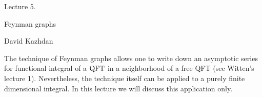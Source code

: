 \def\dbC{{\Bbb C}} 

\def\gr#1{{\fam\eufmfam\relax#1}}

\def\grA{{\gr A}}	\def\gra{{\gr a}}
\def\grB{{\gr B}}	\def\grb{{\gr b}}
\def\grC{{\gr C}}	\def\grc{{\gr c}}
\def\grD{{\gr D}}	\def\grd{{\gr d}}
\def\grE{{\gr E}}	\def\gre{{\gr e}}
\def\grF{{\gr F}}	\def\grf{{\gr f}}
\def\grG{{\gr G}}	\def\grg{{\gr g}}
\def\grH{{\gr H}}	\def\grh{{\gr h}}
\def\grI{{\gr I}}	\def\gri{{\gr i}}
\def\grJ{{\gr J}}	\def\grj{{\gr j}}
\def\grK{{\gr K}}	\def\grk{{\gr k}}
\def\grL{{\gr L}}	\def\grl{{\gr l}}
\def\grM{{\gr M}}	\def\grm{{\gr m}}
\def\grN{{\gr N}}	\def\grn{{\gr n}}
\def\grO{{\gr O}}	\def\gro{{\gr o}}
\def\grP{{\gr P}}	\def\grp{{\gr p}}
\def\grQ{{\gr Q}}	\def\grq{{\gr q}}
\def\grR{{\gr R}}	\def\grr{{\gr r}}
\def\grS{{\gr S}}	\def\grs{{\gr s}}
\def\grT{{\gr T}}	\def\grt{{\gr t}}
\def\grU{{\gr U}}	\def\gru{{\gr u}}
\def\grV{{\gr V}}	\def\grv{{\gr v}}
\def\grW{{\gr W}}	\def\grw{{\gr w}}
\def\grX{{\gr X}}	\def\grx{{\gr x}}
\def\grY{{\gr Y}}	\def\gry{{\gr y}}
\def\grZ{{\gr Z}}	\def\grz{{\gr z}}


\def\scr#1{{\fam\eusmfam\relax#1}}

\def\scrA{{\scr A}}   \def\scrB{{\scr B}}
\def\scrC{{\scr C}}   \def\scrD{{\scr D}}
\def\scrE{{\scr E}}   \def\scrF{{\scr F}}
\def\scrG{{\scr G}}   \def\scrH{{\scr H}}
\def\scrI{{\scr I}}   \def\scrJ{{\scr J}}
\def\scrK{{\scr K}}   \def\scrL{{\scr L}}
\def\scrM{{\scr M}}   \def\scrN{{\scr N}}
\def\scrO{{\scr O}}   \def\scrP{{\scr P}}
\def\scrQ{{\scr Q}}   \def\scrR{{\scr R}}
\def\scrS{{\scr S}}   \def\scrT{{\scr T}}
\def\scrU{{\scr U}}   \def\scrV{{\scr V}}
\def\scrW{{\scr W}}   \def\scrX{{\scr X}}
\def\scrY{{\scr Y}}   \def\scrZ{{\scr Z}}
\def\hatP{{\widehat{P}}}
\def\hatQ{{\widehat{Q}}}
\def\Qhat{{\widehat{Q}}}
\def\ten{\otimes}
\def\hatd{{\hat{d}}}
\NoBlackBoxes
\document

\centerline{\boldtitlefont Lecture 5.}

\medskip
\centerline{\bigboldtitlefont Feynman graphs}

\bigskip
\centerline{David Kazhdan}


\dspace
\bigskip\bigskip


\endsubhead
The technique of Feynman graphs allows one to write down an
asymptotic series for functional integral of a $\text{\rm QFT}$ in a
neighborhood of a free QFT (see Witten's lecture 1). 
Nevertheless, the technique itself can be applied to a
purely finite dimensional integral.
In this lecture we will discuss this application only.

